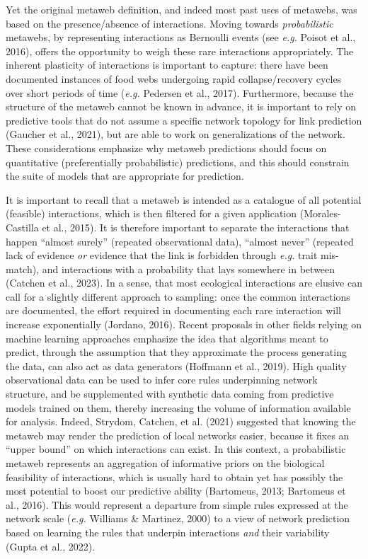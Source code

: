 \documentclass[11pt]{article}
\begin{document}
Yet the original metaweb definition, and indeed most past uses of
metawebs, was based on the presence/absence of interactions. Moving
towards \emph{probabilistic} metawebs, by representing interactions as
Bernoulli events (see \emph{e.g.} Poisot et al., 2016), offers the
opportunity to weigh these rare interactions appropriately. The inherent
plasticity of interactions is important to capture: there have been
documented instances of food webs undergoing rapid collapse/recovery
cycles over short periods of time (\emph{e.g.} Pedersen et al., 2017).
Furthermore, because the structure of the metaweb cannot be known in
advance, it is important to rely on predictive tools that do not assume
a specific network topology for link prediction (Gaucher et al., 2021),
but are able to work on generalizations of the network. These
considerations emphasize why metaweb predictions should focus on
quantitative (preferentially probabilistic) predictions, and this should
constrain the suite of models that are appropriate for prediction.

It is important to recall that a metaweb is intended as a catalogue of
all potential (feasible) interactions, which is then filtered for a
given application (Morales-Castilla et al., 2015). It is therefore
important to separate the interactions that happen ``almost surely''
(repeated observational data), ``almost never'' (repeated lack of
evidence \emph{or} evidence that the link is forbidden through
\emph{e.g.} trait mis-match), and interactions with a probability that
lays somewhere in between (Catchen et al., 2023). In a sense, that most
ecological interactions are elusive can call for a slightly different
approach to sampling: once the common interactions are documented, the
effort required in documenting each rare interaction will increase
exponentially (Jordano, 2016). Recent proposals in other fields relying
on machine learning approaches emphasize the idea that algorithms meant
to predict, through the assumption that they approximate the process
generating the data, can also act as data generators (Hoffmann et al.,
2019). High quality observational data can be used to infer core rules
underpinning network structure, and be supplemented with synthetic data
coming from predictive models trained on them, thereby increasing the
volume of information available for analysis. Indeed, Strydom, Catchen,
et al. (2021) suggested that knowing the metaweb may render the
prediction of local networks easier, because it fixes an ``upper bound''
on which interactions can exist. In this context, a probabilistic
metaweb represents an aggregation of informative priors on the
biological feasibility of interactions, which is usually hard to obtain
yet has possibly the most potential to boost our predictive ability
(Bartomeus, 2013; Bartomeus et al., 2016). This would represent a
departure from simple rules expressed at the network scale (\emph{e.g.}
Williams \& Martinez, 2000) to a view of network prediction based on
learning the rules that underpin interactions \emph{and} their
variability (Gupta et al., 2022).
\end{document}
